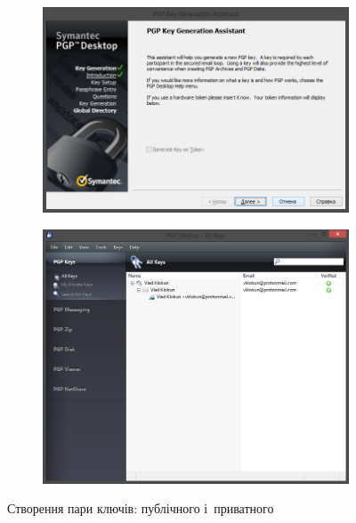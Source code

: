 \documentclass[
	a4paper,
	oneside,
	BCOR = 10mm,
	DIV = 12,
	12pt,
	headings = normal,
]{scrartcl}
\newlength{\gridunitwidth}
\begin{document}
		\begin{figure}[!htbp]
			\begin{subfigure}[b]{6 \gridunitwidth - 1em / (2-1)}
				\includegraphics[width = \columnwidth]{./assets/p01.png}
				\caption{}
				\label{subfig:pk-assistant-start}
			\end{subfigure}%
			\hspace{1em}%
			\begin{subfigure}[b]{6 \gridunitwidth - 1em / (2-1)}
				\includegraphics[width = \columnwidth]{./assets/p06.png}
				\caption{}
				\label{subfig:pk-assistant-res}
			\end{subfigure}
			\caption{Створення пари ключів: публічного і~приватного}
			\label{fig:pk-generation}
		\end{figure}
\end{document}

